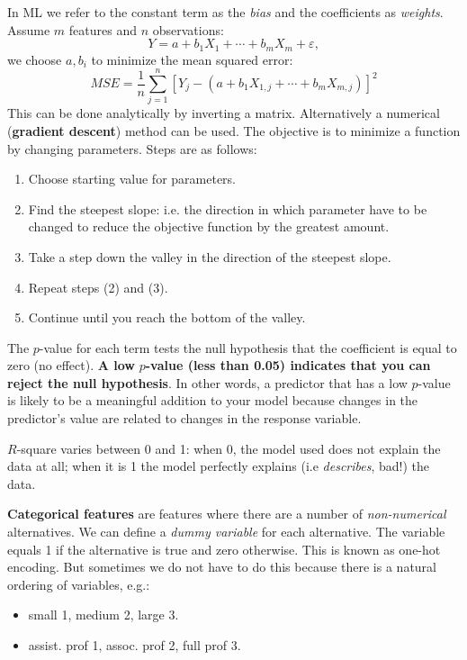 In ML we refer to the constant term as the \textit{bias} and the coefficients as \textit{weights}. Assume $m$ features and $n$ observations:
\begin{equation*}
    Y=a+b_{1} X_{1} +\cdots +b_{m} X_{m} +\varepsilon ,
\end{equation*}
we choose $a,b_{i}$ to minimize the mean squared error:
\begin{equation*}
    MSE=\frac{1}{n}\sum _{j=1}^{n}[ Y_{j} -( a+b_{1} X_{1,j} +\cdots +b_{m} X_{m,j})]^{2}
\end{equation*}
This can be done analytically by inverting a matrix. Alternatively a numerical (\textbf{gradient descent}) method can be used. The objective is to minimize a function by changing parameters. Steps are as follows:
\begin{enumerate}
    \item Choose starting value for parameters.
    \item Find the steepest slope: i.e. the direction in which parameter have to be changed to reduce the objective function by the greatest amount.
    \item Take a step down the valley in the direction of the steepest slope.
    \item Repeat steps (2) and (3).
    \item Continue until you reach the bottom of the valley.
\end{enumerate}

The $p$-value for each term tests the null hypothesis that the coefficient is equal to zero (no effect). \textbf{A low }$p$\textbf{-value (less than 0.05) indicates that you can reject the null hypothesis}. In other words, a predictor that has a low $p$-value is likely to be a meaningful addition to your model because changes in the predictor's value are related to changes in the response variable.

$R$-square varies between 0 and 1: when 0, the model used does not explain the data at all; when it is 1 the model perfectly explains (i.e \textit{describes}, bad!) the data. 

\textbf{Categorical features} are features where there are a number of \textit{non-numerical} alternatives. We can define a \textit{dummy variable} for each alternative. The variable equals 1 if the alternative is true and zero otherwise. This is known as one-hot encoding. But sometimes we do not have to do this because there is a natural ordering of variables, e.g.:
\begin{itemize}
    \item small 1, medium 2, large 3.
    \item assist. prof 1, assoc. prof 2, full prof 3.
\end{itemize}

